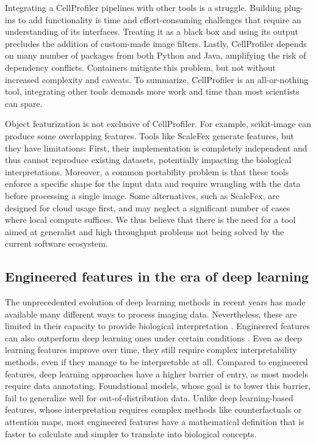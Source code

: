\documentclass{article}
\begin{document}
Integrating a CellProfiler pipelines with other tools is a struggle. Building plug-ins to add functionality is time and effort-consuming challenges that require an understanding of its interfaces. Treating it as a black box and using its output precludes the addition of custom-made image filters. Lastly, CellProfiler depends on many number of packages from both Python and Java, amplifying the risk of dependency conflicts. Containers mitigate this problem, but not without increased complexity and caveats. To summarize, CellProfiler is an all-or-nothing tool, integrating other tools demands more work and time than most scientists can spare.

Object featurization is not exclusive of CellProfiler. For example, scikit-image can produce some overlapping features. Tools like ScaleFex \citep{comoletHighlyEfficientScalable2024,einarolafssonSpaCr2025} generate features, but they have limitations: First, their implementation is completely independent and thus cannot reproduce existing datasets, potentially impacting the biological interpretations. Moreover, a common portability problem is that these tools enforce a specific shape for the input data and require wrangling with the data before processing a single image. Some alternatives, such as ScaleFex, are designed for cloud usage first, and may neglect a significant number of cases where local compute suffices. We thus believe that there is the need for a tool aimed at generalist and high throughput problems not being solved by the current software ecosystem.
\subsection{Engineered features in the era of deep learning}
\label{sec:org9dc3dfa}
The unprecedented evolution of deep learning methods in recent years has made available many different ways to process imaging data. Nevertheless, these are limited in their capacity to provide biological interpretation \citep{moenDeepLearningCellular2019}. Engineered features can also outperform deep learning ones under certain conditions \citep{tangMorphologicalProfilingDrug2024}. Even as deep learning features improve over time, they still require complex interpretability methods, even if they manage to be interpretable at all. Compared to engineered features, deep learning approaches have a higher barrier of entry, as most models require data annotating. Foundational models, whose goal is to lower this barrier, fail to generalize well for out-of-distribution data. Unlike deep learning-based features, whose interpretation requires complex methods like counterfactuals or attention maps, most engineered features have a mathematical definition that is faster to calculate and simpler to translate into biological concepts.
\end{document}
